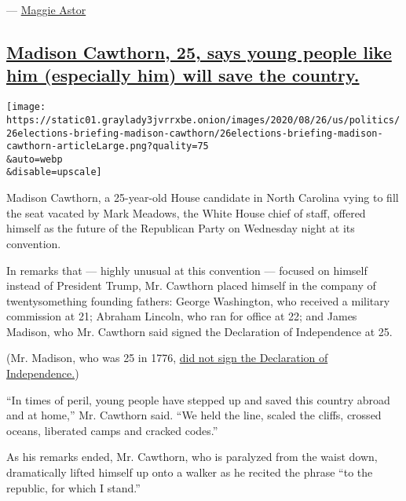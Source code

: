 --- \href{https://www.nytimes3xbfgragh.onion/by/maggie-astor}{Maggie
Astor}

\hypertarget{madison-cawthorn-25-says-young-people-like-him-especially-him-will-save-the-country}{%
\subsection{\texorpdfstring{\protect\hyperlink{madison-cawthorn-25-says-young-people-like-him-especially-him-will-save-the-country}{Madison
Cawthorn, 25, says young people like him (especially him) will save the
country.}}{Madison Cawthorn, 25, says young people like him (especially him) will save the country.}}\label{madison-cawthorn-25-says-young-people-like-him-especially-him-will-save-the-country}}

\texttt{[image: https://static01.graylady3jvrrxbe.onion/images/2020/08/26/us/politics/26elections-briefing-madison-cawthorn/26elections-briefing-madison-cawthorn-articleLarge.png?quality=75\\\&auto=webp\\\&disable=upscale]}

Madison Cawthorn, a 25-year-old House candidate in North Carolina vying
to fill the seat vacated by Mark Meadows, the White House chief of
staff, offered himself as the future of the Republican Party on
Wednesday night at its convention.

In remarks that --- highly unusual at this convention --- focused on
himself instead of President Trump, Mr. Cawthorn placed himself in the
company of twentysomething founding fathers: George Washington, who
received a military commission at 21; Abraham Lincoln, who ran for
office at 22; and James Madison, who Mr. Cawthorn said signed the
Declaration of Independence at 25.

(Mr. Madison, who was 25 in 1776,
\href{https://declaration.fas.harvard.edu/faq/founding-fathers-not-signers\#:~:text=George\%20Washington\%2C\%20John\%20Jay\%2C\%20Alexander,signed\%20the\%20Declaration\%20of\%20Independence.\&text=When\%20Madison\%20became\%20a\%20delegate,delegate\%2C\%20just\%2029\%20years\%20old.}{did
not sign the Declaration of Independence.})

``In times of peril, young people have stepped up and saved this country
abroad and at home,'' Mr. Cawthorn said. ``We held the line, scaled the
cliffs, crossed oceans, liberated camps and cracked codes.''

As his remarks ended, Mr. Cawthorn, who is paralyzed from the waist
down, dramatically lifted himself up onto a walker as he recited the
phrase ``to the republic, for which I stand.''

